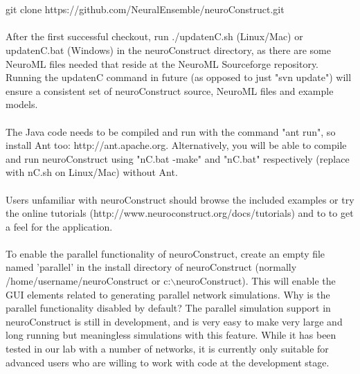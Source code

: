 \documentclass[11pt]{article}
\begin{document}
\\\\git clone https://github.com/NeuralEnsemble/neuroConstruct.git
\\\\After the first successful checkout, run ./updatenC.sh (Linux/Mac) or updatenC.bat (Windows) in the neuroConstruct directory, as there are some NeuroML files needed that reside at the NeuroML Sourceforge repository. Running the updatenC command in future (as opposed to just "svn update") will ensure a consistent set of neuroConstruct source, NeuroML files and example models.
\\\\The Java code needs to be compiled and run with the command "ant run", so install Ant too: http://ant.apache.org. Alternatively, you will be able to compile and run 
neuroConstruct using "nC.bat -make" and "nC.bat" respectively (replace with nC.sh on Linux/Mac) without Ant.
\\\\Users unfamiliar with neuroConstruct should browse the included examples or try the online tutorials (http://www.neuroconstruct.org/docs/tutorials) and to to get a feel for the application. 
\\\\To enable the parallel functionality of neuroConstruct, create an empty file named 'parallel' in the install directory of neuroConstruct (normally /home/username/neuroConstruct or c:$\backslash$neuroConstruct). This will enable the GUI elements related to generating parallel network simulations. Why is the parallel functionality disabled by default? The parallel simulation support in neuroConstruct is still in development, and is very easy to make very large and long running but meaningless simulations with this feature. While it has been tested in our lab with a number of networks, it is currently only suitable for advanced users who are willing to work with code at the development stage.
 
\end{document}
